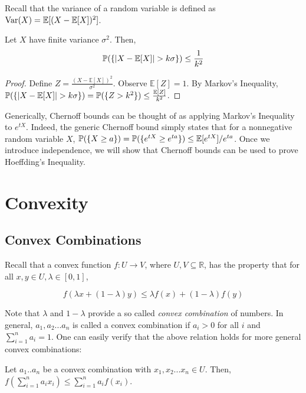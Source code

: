    Recall that the variance of a random variable is defined as 
    $\text{Var}(X) = \mathbb E[(X - \mathbb E[X])^2]$.

    \begin{corollary}
        Let $X$ have finite variance $\sigma^2$. Then, 
        \[ \mathbb P(\{|X - \mathbb E[X]| > k\sigma \}) \leq \frac{1}{k^2} \]
    \end{corollary}
    \begin{proof}
        Define $Z = \frac{(X - \mathbb E[X])^2}{\sigma^2}$. Observe 
        $\mathbb E[Z] = 1$. By Markov's Inequality, $\mathbb P(\{|X - \mathbb E[X]| > k\sigma \}) = \mathbb P(\{ Z > k^2 \}) \leq \frac{\mathbb E[Z]}{k^2}$. 
    \end{proof}

    Generically, Chernoff bounds can be thought of as applying Markov's Inequality to 
    $e^{tX}$. Indeed, the generic Chernoff bound simply states that for a nonnegative 
    random variable $X$, $\mathbb P(\{X \geq a\}) = \mathbb P(\{e^{tX} \geq e^{ta}\}) \leq \mathbb E[e^{tX}]/e^{ta}$. 
    Once we introduce independence, we will show that Chernoff bounds can be used to prove Hoeffding's Inequality.

    \section{Convexity}

    \subsection{Convex Combinations}

    Recall that a convex function $f : U \to V$, where $U,V \subseteq \mathbb R$, has the property that for all 
    $x,y \in U, \lambda \in [0,1]$,

    \[ f(\lambda x + (1-\lambda) y) \leq \lambda f(x) + (1-\lambda) f(y) \]

    Note that $\lambda$ and $1-\lambda$ provide a so called \emph{convex combination} of numbers. 
    In general, $a_1, a_2...a_n$ is called a convex combination if $a_i > 0$ for all $i$ and 
    $\sum_{i=1}^n a_i = 1$. One can easily verify that the above relation holds for more 
    general convex combinations: 

    \begin{lemma}
        Let $a_1..a_n$ be a convex combination with $x_1,x_2...x_n \in U$. Then, 
        $f(\sum_{i=1}^n a_i x_i) \leq \sum_{i=1}^n a_i f(x_i)$.
    \end{lemma}
    
